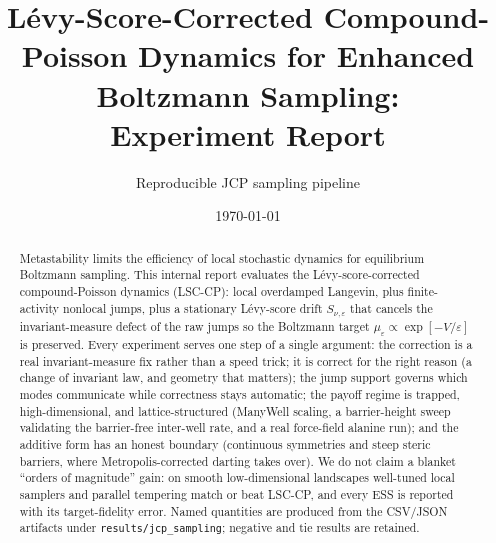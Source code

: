 \documentclass[11pt]{article}
\title{L\'evy-Score-Corrected Compound-Poisson Dynamics for Enhanced Boltzmann Sampling:\\
Experiment Report}
\author{Reproducible JCP sampling pipeline}
\date{\today}
\begin{document}
\maketitle
\begin{abstract}
Metastability limits the efficiency of local stochastic dynamics for equilibrium Boltzmann
sampling. This internal report evaluates the L\'evy-score-corrected compound-Poisson dynamics
(LSC-CP): local overdamped Langevin, plus finite-activity nonlocal jumps, plus a stationary
L\'evy-score drift $S_{\nu,\varepsilon}$ that cancels the invariant-measure defect of the raw jumps
so the Boltzmann target $\mu_\varepsilon\propto\exp[-V/\varepsilon]$ is preserved. Every experiment
serves one step of a single argument: the correction is a real invariant-measure fix rather than a
speed trick; it is correct for the right reason (a change of invariant law, and geometry that
matters); the jump support governs which modes communicate while correctness stays automatic; the
payoff regime is trapped, high-dimensional, and lattice-structured (ManyWell scaling, a
barrier-height sweep validating the barrier-free inter-well rate, and a real force-field alanine
run); and the additive form has an honest boundary (continuous symmetries and steep steric barriers,
where Metropolis-corrected darting takes over). We do not claim a blanket ``orders of magnitude''
gain: on smooth low-dimensional landscapes well-tuned local samplers and parallel tempering match or
beat LSC-CP, and every ESS is reported with its target-fidelity error. Named quantities are produced
from the CSV/JSON artifacts under \texttt{results/jcp\_sampling}; negative and tie results are
retained.
\end{abstract}
















\appendix

\end{document}
